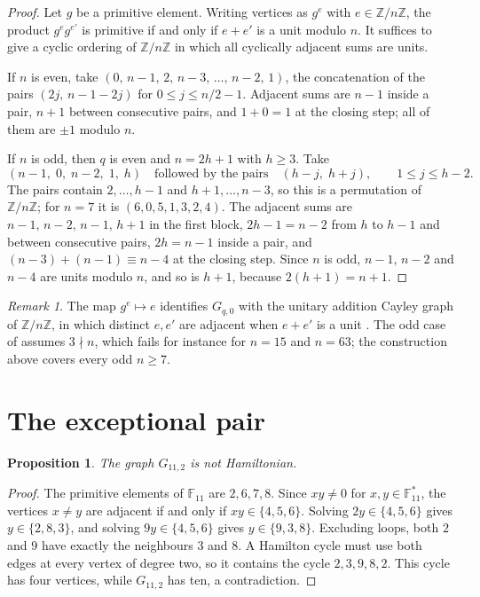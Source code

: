 \documentclass{amsart}
\newtheorem{proposition}[theorem]{Proposition}
\theoremstyle{remark}
\newtheorem{remark}[theorem]{Remark}
\numberwithin{equation}{section}
\numberwithin{table}{section}
\newcommand{\F}{\mathbb{F}}
\begin{document}
\begin{proof}
Let $g$ be a primitive element. Writing vertices as $g^{e}$ with $e\in\mathbb Z/n\mathbb Z$, the product $g^{e}g^{e'}$ is primitive if and only if $e+e'$ is a unit modulo $n$. It suffices to give a cyclic ordering of $\mathbb Z/n\mathbb Z$ in which all cyclically adjacent sums are units.

If $n$ is even, take $(0,\,n-1,\,2,\,n-3,\,\dots,\,n-2,\,1)$, the concatenation of the pairs $(2j,\,n-1-2j)$ for $0\le j\le n/2-1$. Adjacent sums are $n-1$ inside a pair, $n+1$ between consecutive pairs, and $1+0=1$ at the closing step; all of them are $\pm1$ modulo $n$.

If $n$ is odd, then $q$ is even and $n=2h+1$ with $h\ge3$. Take
\[
(n-1,\;0,\;n-2,\;1,\;h)\quad\text{followed by the pairs}\quad (h-j,\;h+j),\qquad 1\le j\le h-2.
\]
The pairs contain $2,\dots,h-1$ and $h+1,\dots,n-3$, so this is a permutation of $\mathbb Z/n\mathbb Z$; for $n=7$ it is $(6,0,5,1,3,2,4)$. The adjacent sums are $n-1,\,n-2,\,n-1,\,h+1$ in the first block, $2h-1=n-2$ from $h$ to $h-1$ and between consecutive pairs, $2h=n-1$ inside a pair, and $(n-3)+(n-1)\equiv n-4$ at the closing step. Since $n$ is odd, $n-1$, $n-2$ and $n-4$ are units modulo $n$, and so is $h+1$, because $2(h+1)=n+1$.
\end{proof}

\begin{remark}\label{rem:sgs}
The map $g^{e}\mapsto e$ identifies $G_{q,0}$ with the unitary addition Cayley graph of $\mathbb Z/n\mathbb Z$, in which distinct $e,e'$ are adjacent when $e+e'$ is a unit \cite{SGS}. The odd case of \cite[Theorem~11]{SGS} assumes $3\nmid n$, which fails for instance for $n=15$ and $n=63$; the construction above covers every odd $n\ge7$.
\end{remark}

\section{The exceptional pair}\label{sec:exception}

\begin{proposition}\label{prop:exception}
The graph $G_{11,2}$ is not Hamiltonian.
\end{proposition}

\begin{proof}
The primitive elements of $\F_{11}$ are $2,6,7,8$. Since $xy\neq0$ for $x,y\in\F_{11}^{*}$, the vertices $x\neq y$ are adjacent if and only if $xy\in\{4,5,6\}$. Solving $2y\in\{4,5,6\}$ gives $y\in\{2,8,3\}$, and solving $9y\in\{4,5,6\}$ gives $y\in\{9,3,8\}$. Excluding loops, both $2$ and $9$ have exactly the neighbours $3$ and $8$. A Hamilton cycle must use both edges at every vertex of degree two, so it contains the cycle $2,3,9,8,2$. This cycle has four vertices, while $G_{11,2}$ has ten, a contradiction.
\end{proof}
\end{document}
